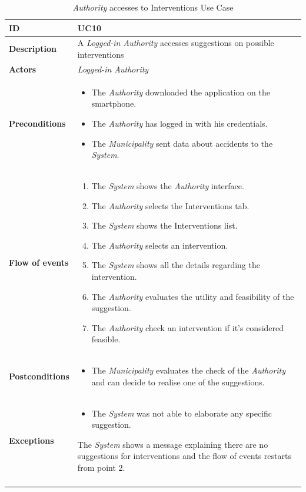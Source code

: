 \documentclass {article}
\begin{document}
	\begin{longtable}{| p{3 cm} | p{10.5cm} |} 
			\hline
			{\bf ID} & UC10 \\
			\hline
			{\bf Description} & A {\it Logged-in Authority} accesses suggestions on possible interventions \\
			\hline
			{\bf Actors} & {\it Logged-in Authority}\\
			\hline
			{\bf Preconditions} & 
					\begin{itemize}
						\item The {\it Authority} downloaded the application on the smartphone.
						\item The {\it Authority} has logged in with his credentials.
						\item The {\it Municipality} sent data about accidents to the {\it System}.
						\end{itemize}	\\
			\hline
			{\bf Flow of events} &	
					\begin{enumerate}
						\item The {\it System} shows the {\it Authority} interface.
						\item The {\it Authority} selects the Interventions tab.
						\item The {\it System} shows the Interventions list. 
						\item The {\it Authority} selects an intervention.
						\item The {\it System} shows all the details regarding the intervention. 
						\item The {\it Authority} evaluates the utility and feasibility of the suggestion.
						\item The {\it Authority} check an intervention if it's considered feasible.
					\end{enumerate}	\\
			\hline
			{\bf Postconditions} & 
				\begin{itemize}
					\item The {\it Municipality} evaluates the check of the {\it Authority} and can decide to realise one of the suggestions.
				\end{itemize} \\
			\hline
			{\bf Exceptions} & 	
			\begin{itemize}
				\item The {\it System} was not able to elaborate any specific suggestion.
			\end{itemize}
			The {\it System} shows a message explaining there are no suggestions for interventions and the flow of events restarts from point 2. \\ 
			\hline
			\caption{{\it Authority} accesses to Interventions Use Case}
			\end{longtable} 
\end{document}
